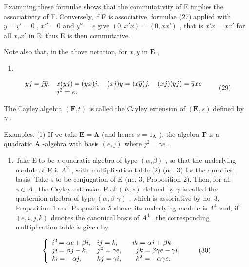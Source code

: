 Examining these formulae shows that the commutativity of E implies the associativity of F. Conversely, if F is associative, formulae (27) applied with \(y = y' = 0\) , \(x'' = 0\) and \(y'' = e\) give \((0, x'x) = (0, xx')\) , that is \(x'x = xx'\) for all \(x, x'\) in E; thus E is then commutative.

Note also that, in the above notation, for \(x, y\) in \(\mathbf{E}\) ,

\begin{enumerate}
\def\labelenumi{(\arabic{enumi})}
\setcounter{enumi}{27}
\tightlist
\item
\end{enumerate}

\[
\begin{array}{r l} y j = j \overline {{y}}, & x (y j) = (y x) j, \quad (x j) y = (x \overline {{y}}) j, \quad (x j) (y j) = \overline {{y}} x e \\ & j ^ {2} = e. \end{array}\tag{29}
\]

The Cayley algebra \((\mathbf{F}, t)\) is called the Cayley extension of \((\mathbf{E}, s)\) defined by \(\gamma\) .

Examples. (1) If we take \(\mathbf{E} = \mathbf{A}\) (and hence \(s = 1_{\mathbf{A}}\) ), the algebra \(\mathbf{F}\) is a quadratic \(\mathbf{A}\) -algebra with basis \((e,j)\) where \(j^2 = \gamma e\) .

\begin{enumerate}
\def\labelenumi{(\arabic{enumi})}
\setcounter{enumi}{1}
\tightlist
\item
  Take E to be a quadratic algebra of type \((\alpha, \beta)\) , so that the underlying module of E is \(A^{2}\) , with multiplication table (2) (no. 3) for the canonical basis. Take s to be conjugation of E (no. 3, Proposition 2). Then, for all \(\gamma \in A\) , the Cayley extension F of \((E, s)\) defined by \(\gamma\) is called the quaternion algebra of type \((\alpha, \beta, \gamma)\) , which is associative by no. 3, Proposition 1 and Proposition 5 above; its underlying module is \(A^{4}\) and, if \((e, i, j, k)\) denotes the canonical basis of \(A^{4}\) , the corresponding multiplication table is given by
\end{enumerate}

\[
\left\{ \begin{array}{l l} i ^ {2} = \alpha e + \beta i, & i j = k, \qquad i k = \alpha j + \beta k, \\ j i = \beta j - k, & j ^ {2} = \gamma e, \qquad j k = \beta \gamma e - \gamma i, \\ k i = - \alpha j, & k j = \gamma i, \qquad k ^ {2} = - \alpha \gamma e. \end{array} \right.\tag{30}
\]

